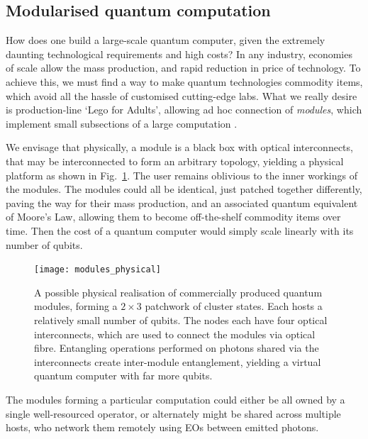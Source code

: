 %
%

\subsection{Modularised quantum computation} \label{sec:module} 

How does one build a large-scale quantum computer, given the extremely daunting technological requirements and high costs? In any industry, economies of scale allow the mass production, and rapid reduction in price of technology. To achieve this, we must find a way to make quantum technologies commodity items, which avoid all the hassle of customised cutting-edge labs. What we really desire is production-line `Lego for Adults{\texttrademark}', allowing ad hoc connection of \textit{modules}, which implement small subsections of a large computation \cite{bib:FowlerPrivate}.

We envisage that physically, a module is a black box with optical interconnects, that may be interconnected to form an arbitrary topology, yielding a physical platform as shown in Fig.~\ref{fig:modules_physical}. The user remains oblivious to the inner workings of the modules. The modules could all be identical, just patched together differently, paving the way for their mass production, and an associated quantum equivalent of Moore's Law, allowing them to become off-the-shelf commodity items over time. Then the cost of a quantum computer would simply scale linearly with its number of qubits.

\begin{figure}[!htbp]
	\texttt{[image: modules\_physical]}
	\captionspace \caption{A possible physical realisation of commercially produced quantum modules, forming a \mbox{$2\times 3$} patchwork of cluster states. Each hosts a relatively small number of qubits. The nodes each have four optical interconnects, which are used to connect the modules via optical fibre. Entangling operations performed on photons shared via the interconnects create inter-module entanglement, yielding a virtual quantum computer with far more qubits.}\label{fig:modules_physical}
\end{figure}

The modules forming a particular computation could either be all owned by a single well-resourced operator, or alternately might be shared across multiple hosts, who network them remotely using EOs between emitted photons.

